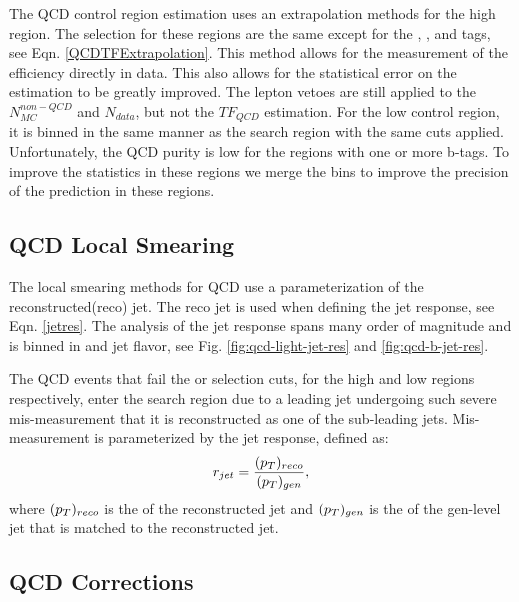 The QCD control region estimation uses an extrapolation methods for the high \dm{} region. The selection for these regions are the same except for the \nt, \nrt, and \nw{} tags, see Eqn. \ref{QCDTFExtrapolation}. This method allows for the measurement of the efficiency directly in data. This also allows for the statistical error on the estimation to be greatly improved. The lepton vetoes are still applied to the $N_{MC}^{non-QCD}$ and $N_{data}$, but not the $TF_{QCD}$ estimation. For the low \dm{} control region, it is binned in the same manner as the search region with the same cuts applied. Unfortunately, the QCD purity is low for the regions with one or more b-tags. To improve the statistics in these regions we merge the \met{} bins to improve the precision of the prediction in these regions. 

\subsection{QCD Local Smearing}\label{Smearing}

The local smearing methods for QCD use a parameterization of the reconstructed(reco) jet. The reco jet is used when defining the jet response, see Eqn. \ref{jetres}. The analysis of the jet response spans many order of magnitude and is binned in \pt{} and jet flavor, see Fig. \ref{fig:qcd-light-jet-res} and \ref{fig:qcd-b-jet-res}. 

The QCD events that fail the \highdm{} or \lowdm{} selection cuts, for the high and low \dm{} regions respectively, enter the search region due to a leading jet undergoing such severe mis-measurement that it is reconstructed as one of the sub-leading jets. Mis-measurement is parameterized by the jet response, defined as:
\begin{equation}\label{jetres}
r_{jet}=\frac{(p_{T})_{reco}}{(p_{T})_{gen}},
\end{equation}
where $(p_{T})_{reco}$ is the \pt{} of the reconstructed jet and $(p_{T})_{gen}$ is the \pt{} of the gen-level jet that is matched to the reconstructed jet.

\subsection{QCD Corrections}

